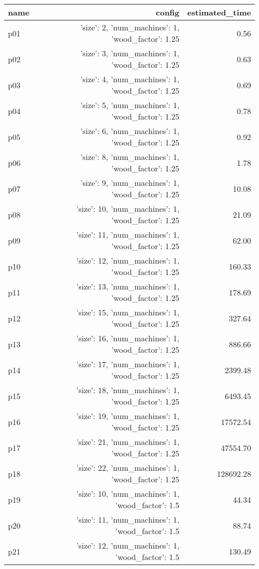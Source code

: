 \documentclass{article}
\begin{document}
                            \begin{center}
                            \scriptsize
                            \begin{tabular}{@{}l|r|r@{}}
                            name & config & estimated\_time\\\midrule
                              p01&{'size': 2, 'num\_machines': 1, 'wood\_factor': 1.25}&0.56\\
  p02&{'size': 3, 'num\_machines': 1, 'wood\_factor': 1.25}&0.63\\
  p03&{'size': 4, 'num\_machines': 1, 'wood\_factor': 1.25}&0.69\\
  p04&{'size': 5, 'num\_machines': 1, 'wood\_factor': 1.25}&0.78\\
  p05&{'size': 6, 'num\_machines': 1, 'wood\_factor': 1.25}&0.92\\
  p06&{'size': 8, 'num\_machines': 1, 'wood\_factor': 1.25}&1.78\\
  p07&{'size': 9, 'num\_machines': 1, 'wood\_factor': 1.25}&10.08\\
  p08&{'size': 10, 'num\_machines': 1, 'wood\_factor': 1.25}&21.09\\
  p09&{'size': 11, 'num\_machines': 1, 'wood\_factor': 1.25}&62.00\\
  p10&{'size': 12, 'num\_machines': 1, 'wood\_factor': 1.25}&160.33\\
  p11&{'size': 13, 'num\_machines': 1, 'wood\_factor': 1.25}&178.69\\
  p12&{'size': 15, 'num\_machines': 1, 'wood\_factor': 1.25}&327.64\\
  p13&{'size': 16, 'num\_machines': 1, 'wood\_factor': 1.25}&886.66\\
  p14&{'size': 17, 'num\_machines': 1, 'wood\_factor': 1.25}&2399.48\\
  p15&{'size': 18, 'num\_machines': 1, 'wood\_factor': 1.25}&6493.45\\
  p16&{'size': 19, 'num\_machines': 1, 'wood\_factor': 1.25}&17572.54\\
  p17&{'size': 21, 'num\_machines': 1, 'wood\_factor': 1.25}&47554.70\\
  p18&{'size': 22, 'num\_machines': 1, 'wood\_factor': 1.25}&128692.28\\
  p19&{'size': 10, 'num\_machines': 1, 'wood\_factor': 1.5}&44.34\\
  p20&{'size': 11, 'num\_machines': 1, 'wood\_factor': 1.5}&88.74\\
  p21&{'size': 12, 'num\_machines': 1, 'wood\_factor': 1.5}&130.49\\

\end{tabular}
\end{center}
\end{document}
